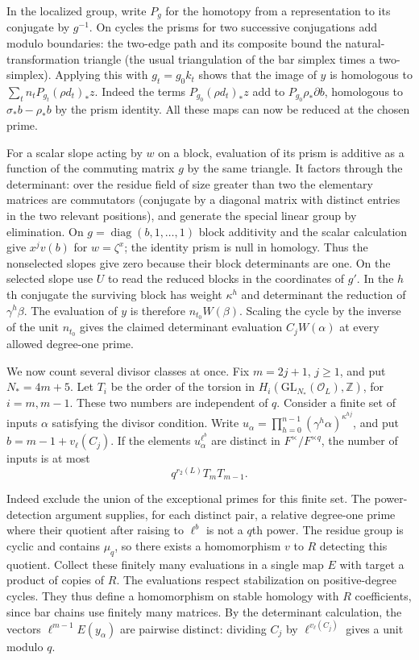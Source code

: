 \documentclass[11pt]{amsart}
\theoremstyle{definition}
\theoremstyle{remark}
\begin{document}
In the localized group, write $P_g$ for the homotopy from a
representation to its conjugate by $g^{-1}$. On cycles the prisms
for two successive conjugations add modulo boundaries: the two-edge
path and its composite bound the natural-transformation triangle
(the usual triangulation of the bar simplex times a two-simplex).
Applying this with $g_t=g_0 k_t$ shows that the image of $y$ is
homologous to $\sum_t n_t P_{g_t}(\rho d_t)_*z$.
Indeed the terms $P_{g_0}(\rho d_t)_*z$ add to
$P_{g_0}\rho_*\partial b$, homologous to
$\sigma_*b-\rho_*b$ by the prism identity. All these maps can now
be reduced at the chosen prime.

For a scalar slope acting by $w$ on a block, evaluation of its prism
is additive as a function of the commuting matrix $g$ by the same
triangle. It factors through the determinant: over the residue field
of size greater than two the elementary matrices are commutators
(conjugate by a diagonal matrix with distinct entries in the two
relevant positions), and generate the special linear group by
elimination. On $g=\operatorname{diag}(b,1,\ldots,1)$ block
additivity and the scalar calculation give $x^jv(b)$ for $w=\zeta^x$;
the identity prism is null in homology. Thus the nonselected slopes
give zero because their block determinants are one. On the selected
slope use $U$ to read the reduced blocks in the coordinates of $g'$.
In the $h$th conjugate the surviving block has weight $\kappa^h$
and determinant the reduction of $\gamma^h\beta$. The evaluation
of $y$ is therefore $n_{t_0}W(\beta)$. Scaling the cycle by the
inverse of the unit $n_{t_0}$ gives the claimed determinant evaluation
$C_jW(\alpha)$ at every allowed degree-one prime.

We now count several divisor classes at once. Fix $m=2j+1$,
$j\ge1$, and put $N_*=4m+5$. Let $T_i$ be the order of the torsion
in $H_i(\mathrm{GL}_{N_*}(\mathcal O_L),\mathbb Z)$, for $i=m,m-1$.
These two numbers are independent of $q$. Consider a finite set of
inputs $\alpha$ satisfying the divisor condition. Write
$u_\alpha=\prod_{h=0}^{n-1}(\gamma^h\alpha)^{\kappa^{hj}}$, and put
$b=m-1+v_\ell(C_j)$. If the elements $u_\alpha^{\ell^b}$ are distinct
in $F^\times/F^{\times q}$, the number of inputs is at most
\[
                     q^{r_2(L)}T_mT_{m-1}.
\]

Indeed exclude the union of the exceptional primes for this finite
set. The power-detection argument supplies, for each distinct pair,
a relative degree-one prime where their quotient after raising to
$\ell^b$ is not a $q$th power. The residue group is cyclic and
contains $\mu_q$, so there exists a homomorphism $v$ to $R$ detecting
this quotient. Collect these finitely many evaluations in a single
map $E$ with target a product of copies of $R$. The evaluations
respect stabilization on positive-degree cycles. They thus define
a homomorphism on stable homology with $R$ coefficients, since bar
chains use finitely many matrices. By the determinant calculation,
the vectors $\ell^{m-1}E(y_\alpha)$ are pairwise distinct: dividing
$C_j$ by $\ell^{v_\ell(C_j)}$ gives a unit modulo $q$.
\end{document}
